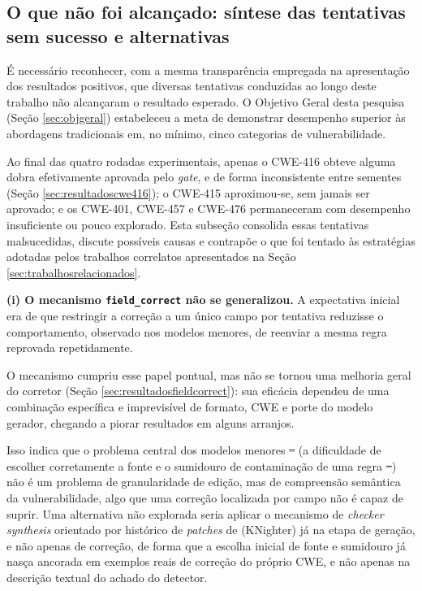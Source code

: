 \documentclass[
    12pt,                %
    openright,           %
    oneside,             %
    a4paper,             %
    english,             %
    brazil               %
]{abntex2}
\newcommand{\antigo}[1]{\sout{#1}}
\newcommand{\novo}[1]{{\color{red}#1}}
\begin{document}
\subsection{O que não foi alcançado: síntese das tentativas sem sucesso e alternativas}
\label{sec:tentativassemsucesso}
\par
É necessário reconhecer, com a mesma transparência empregada na apresentação dos resultados positivos, que diversas tentativas conduzidas ao longo deste trabalho não alcançaram o resultado esperado.
O Objetivo Geral desta pesquisa (Seção \ref{sec:objgeral}) estabeleceu a meta de demonstrar desempenho superior às abordagens tradicionais em, no mínimo, cinco categorias de vulnerabilidade.
\par
Ao final das quatro rodadas experimentais, apenas o CWE-416 obteve alguma dobra efetivamente aprovada pelo \textit{gate}, e de forma inconsistente entre sementes (Seção \ref{sec:resultadoscwe416}); o CWE-415 aproximou-se, sem jamais ser aprovado; e os CWE-401, CWE-457 e CWE-476 permaneceram com desempenho insuficiente ou pouco explorado.
Esta subseção consolida essas tentativas malsucedidas, discute possíveis causas e contrapõe o que foi tentado às estratégias adotadas pelos trabalhos correlatos apresentados na Seção \ref{sec:trabalhosrelacionados}.
\par
\textbf{(i) O mecanismo \texttt{field\_correct} não se generalizou.}
A expectativa inicial era de que restringir a correção a um único campo por tentativa reduzisse o comportamento, observado nos modelos menores, de reenviar a mesma regra reprovada repetidamente.
\par
O mecanismo cumpriu esse papel pontual, mas não se tornou uma melhoria geral do corretor (Seção \ref{sec:resultadosfieldcorrect}): sua eficácia dependeu de uma combinação específica e imprevisível de formato, CWE e porte do modelo gerador, chegando a piorar resultados em alguns arranjos.
\par
Isso indica que o problema central dos modelos menores\antigo{ --}\novo{ (}a dificuldade de escolher corretamente a fonte e o sumidouro de contaminação de uma regra\antigo{ --}\novo{)} não é um problema de granularidade de edição, mas de compreensão semântica da vulnerabilidade, algo que uma correção localizada por campo não é capaz de suprir.
Uma alternativa não explorada seria aplicar o mecanismo de \textit{checker synthesis} orientado por histórico de \textit{patches} de  (KNighter) já na etapa de geração, e não apenas de correção, de forma que a escolha inicial de fonte e sumidouro já nasça ancorada em exemplos reais de correção do próprio CWE, e não apenas na descrição textual do achado do detector.
\end{document}
